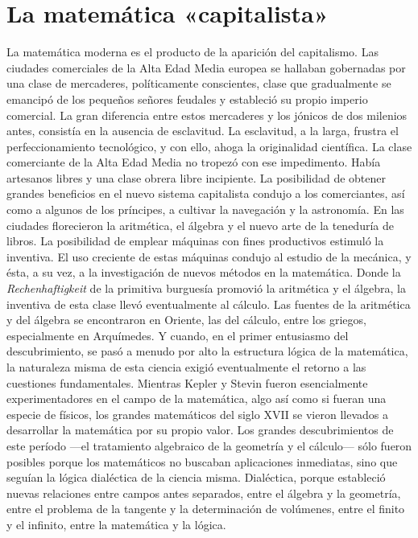 \documentclass[a4paper, 12pt]{article}
\begin{document}
\section*{La matemática «capitalista»}

La matemática moderna es el producto de la aparición del capitalismo. Las
ciudades comerciales de la Alta Edad Media europea se hallaban gobernadas por
una clase de mercaderes, políticamente conscientes, clase que gradualmente se
emancipó de los pequeños señores feudales y estableció su propio imperio
comercial. La gran diferencia entre estos mercaderes y los jónicos de dos
milenios antes, consistía en la ausencia de esclavitud. La esclavitud, a la
larga, frustra el perfeccionamiento tecnológico, y con ello, ahoga la
originalidad científica. La clase comerciante de la Alta Edad Media no tropezó
con ese impedimento. Había artesanos libres y una clase obrera libre incipiente.
La posibilidad de obtener grandes beneficios en el nuevo sistema capitalista
condujo a los comerciantes, así como a algunos de los príncipes, a cultivar la
navegación y la astronomía. En las ciudades florecieron la aritmética, el
álgebra y el nuevo arte de la teneduría de libros. La posibilidad de emplear
máquinas con fines productivos estimuló la inventiva. El uso creciente de estas
máquinas condujo al estudio de la mecánica, y ésta, a su vez, a la investigación
de nuevos métodos en la matemática. Donde la \textit{Rechenhaftigkeit} de la
primitiva burguesía promovió la aritmética y el álgebra, la inventiva de esta
clase llevó eventualmente al cálculo. Las fuentes de la aritmética y del álgebra
se encontraron en Oriente, las del cálculo, entre los griegos, especialmente en
Arquímedes. Y cuando, en el primer entusiasmo del descubrimiento, se pasó a
menudo por alto la estructura lógica de la matemática, la naturaleza misma de
esta ciencia exigió eventualmente el retorno a las cuestiones fundamentales.
Mientras Kepler y Stevin fueron esencialmente experimentadores en el campo de la
matemática, algo así como si fueran una especie de físicos, los grandes
matemáticos del siglo XVII se vieron llevados a desarrollar la matemática por su
propio valor. Los grandes descubrimientos de este período ---el tratamiento
algebraico de la geometría y el cálculo--- sólo fueron posibles porque los
matemáticos no buscaban aplicaciones inmediatas, sino que seguían la lógica
dialéctica de la ciencia misma. Dialéctica, porque estableció nuevas relaciones
entre campos antes separados, entre el álgebra y la geometría, entre el problema
de la tangente y la determinación de volúmenes, entre el finito y el infinito,
entre la matemática y la lógica.
\end{document}
